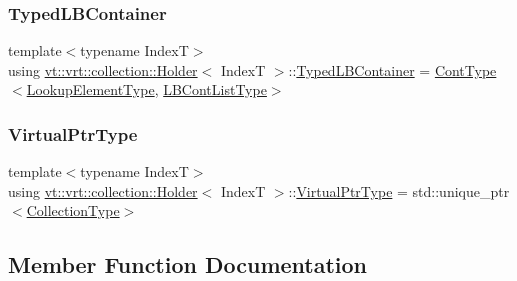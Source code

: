 \subsubsection{\texorpdfstring{Typed\+L\+B\+Container}{TypedLBContainer}}
{\footnotesize\ttfamily template$<$typename IndexT$>$ \\
using \hyperlink{structvt_1_1vrt_1_1collection_1_1_holder}{vt\+::vrt\+::collection\+::\+Holder}$<$ IndexT $>$\+::\hyperlink{structvt_1_1vrt_1_1collection_1_1_holder_a299791b3df9ee801283b1ca8ed24433b}{Typed\+L\+B\+Container} =  \hyperlink{structvt_1_1vrt_1_1collection_1_1_holder_a89a4952463fceb239ce3415304526dc9}{Cont\+Type}$<$\hyperlink{structvt_1_1vrt_1_1collection_1_1_holder_a619f5acc2501a0d3f69cca99f89e72fd}{Lookup\+Element\+Type}, \hyperlink{structvt_1_1vrt_1_1collection_1_1_holder_a4a738b6b6c2216d7a5b528956502172a}{L\+B\+Cont\+List\+Type}$>$}

\mbox{\label{structvt_1_1vrt_1_1collection_1_1_holder_a0a7eb9b25e205e5d113ec13964547a8e}} 
\subsubsection{\texorpdfstring{Virtual\+Ptr\+Type}{VirtualPtrType}}
{\footnotesize\ttfamily template$<$typename IndexT$>$ \\
using \hyperlink{structvt_1_1vrt_1_1collection_1_1_holder}{vt\+::vrt\+::collection\+::\+Holder}$<$ IndexT $>$\+::\hyperlink{structvt_1_1vrt_1_1collection_1_1_holder_a0a7eb9b25e205e5d113ec13964547a8e}{Virtual\+Ptr\+Type} =  std\+::unique\+\_\+ptr$<$\hyperlink{structvt_1_1vrt_1_1collection_1_1_holder_ad940337a70ac576f960ea2d22a33f290}{Collection\+Type}$>$}



\subsection{Member Function Documentation}
\mbox{\label{structvt_1_1vrt_1_1collection_1_1_holder_a501a01ffef66ba8606ec7d9a808b3892}} 
